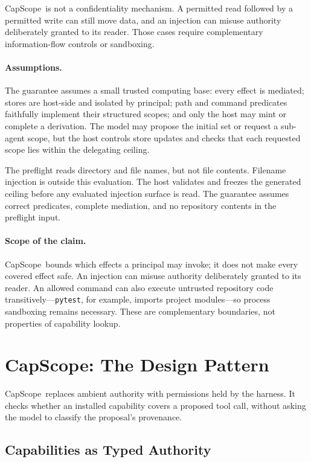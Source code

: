 \documentclass[sigplan,review,anonymous]{acmart}
\newcommand{\tool}{CapScope\xspace}
\begin{document}
  \tool\ is not a confidentiality mechanism. A permitted read followed by a
  permitted write can still move data, and an injection can misuse authority
  deliberately granted to its reader. Those cases require complementary
  information-flow controls or sandboxing.

  \paragraph{Assumptions.}
  The guarantee assumes a small trusted computing base: every effect is
  mediated; stores are host-side and isolated by principal; path and command
  predicates faithfully implement their structured scopes; and only the host may
  mint or complete a derivation. The model may propose the initial set or request
  a sub-agent scope, but the host controls store updates and checks that each
  requested scope lies within the delegating ceiling.

  The preflight reads directory and file names, but not file contents. Filename
  injection is outside this evaluation. The host validates and freezes the
  generated ceiling before any evaluated injection surface is read. The
  guarantee assumes correct predicates, complete mediation, and no repository
  contents in the preflight input.

  \paragraph{Scope of the claim.}
  \tool\ bounds which effects a principal may invoke; it does not make every
  covered effect safe. An injection can misuse authority deliberately granted to
  its reader. An allowed command can also execute untrusted repository code
  transitively---\texttt{pytest}, for example, imports project modules---so
  process sandboxing remains necessary. These are complementary boundaries, not
  properties of capability lookup.

  \section{\tool: The Design Pattern}
  \label{sec:promptcap}

  \tool\ replaces ambient authority with permissions held by the harness. It
  checks whether an installed capability covers a proposed tool call, without
  asking the model to classify the proposal's provenance.

  \subsection{Capabilities as Typed Authority}
  \label{sec:captype}
\end{document}
